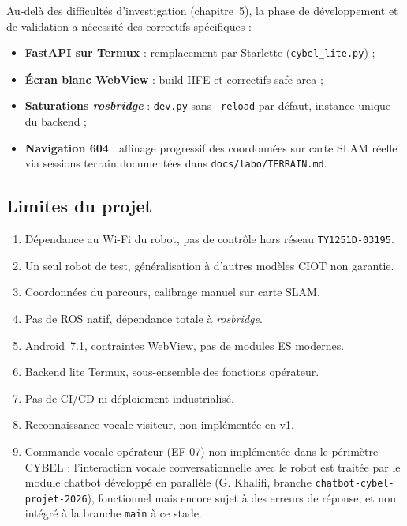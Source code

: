 Au-delà des difficultés d'investigation (chapitre~5), la phase de
développement et de validation a nécessité des correctifs spécifiques :

\begin{itemize}
    \item \textbf{FastAPI sur Termux} : remplacement par Starlette
    (\texttt{cybel\_lite.py}) ;
    \item \textbf{Écran blanc WebView} : build IIFE et correctifs safe-area ;
    \item \textbf{Saturations \textit{rosbridge}} : \texttt{dev.py} sans
    \texttt{--reload} par défaut, instance unique du backend ;
    \item \textbf{Navigation 604} : affinage progressif des coordonnées sur
    carte SLAM réelle via sessions terrain documentées dans
    \texttt{docs/labo/TERRAIN.md}.
\end{itemize}


\subsection{Limites du projet}

\begin{enumerate}
    \item Dépendance au Wi-Fi du robot, pas de contrôle hors réseau
    \texttt{TY1251D-03195}.
    \item Un seul robot de test, généralisation à d'autres modèles CIOT non
    garantie.
    \item Coordonnées du parcours, calibrage manuel sur carte SLAM.
    \item Pas de ROS natif, dépendance totale à \textit{rosbridge}.
    \item Android~7.1, contraintes WebView, pas de modules ES modernes.
    \item Backend lite Termux, sous-ensemble des fonctions opérateur.
    \item Pas de CI/CD ni déploiement industrialisé.
    \item Reconnaissance vocale visiteur, non implémentée en v1.
    \item Commande vocale opérateur (EF-07) non implémentée dans le périmètre
    CYBEL : l'interaction vocale conversationnelle avec le robot est traitée
    par le module chatbot développé en parallèle (G. Khalifi, branche
    \texttt{chatbot-cybel-projet-2026}), fonctionnel mais encore sujet à des
    erreurs de réponse, et non intégré à la branche \texttt{main} à ce stade.
\end{enumerate}


